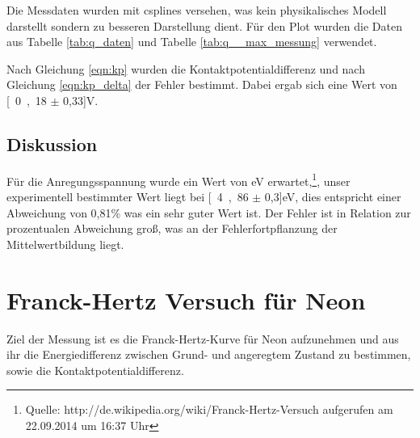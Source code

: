 \documentclass[12pt,a4paper]{article}
\begin{document}
Die Messdaten wurden mit csplines versehen, was kein physikalisches Modell darstellt sondern zu besseren Darstellung dient. Für den Plot wurden die Daten aus Tabelle \ref{tab:q_daten} und Tabelle \ref{tab:q__max_messung} verwendet.

Nach Gleichung \ref{eqn:kp} wurden die Kontaktpotentialdifferenz und nach Gleichung \ref{eqn:kp_delta} der Fehler bestimmt. Dabei ergab sich eine Wert von \unit[0,18 $\pm$ 0,33]{V}.

\subsection{Diskussion}

Für die Anregungsspannung wurde ein Wert von \unit[4,9]{eV} erwartet,\footnote{Quelle: http://de.wikipedia.org/wiki/Franck-Hertz-Versuch aufgerufen am 22.09.2014 um 16:37 Uhr}, unser experimentell bestimmter Wert liegt bei \unit[4,86 $\pm$ 0,3]{eV}, dies entspricht einer Abweichung von 0,81\% was ein sehr guter Wert ist. Der Fehler ist in Relation zur prozentualen Abweichung groß, was an der Fehlerfortpflanzung der Mittelwertbildung liegt.

\section{Franck-Hertz Versuch für Neon}
Ziel der Messung ist es die Franck-Hertz-Kurve für Neon aufzunehmen und aus ihr die Energiedifferenz zwischen Grund- und angeregtem Zustand zu bestimmen, sowie die Kontaktpotentialdifferenz.
\end{document}
